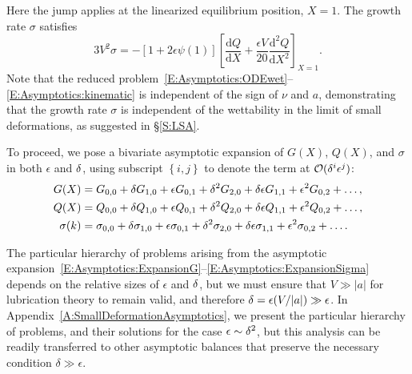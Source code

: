 \documentclass{jfm}
\newcommand{\dd}[2]{\frac{\mathrm{d} #1}{\mathrm{d} #2}}
\newcommand{\aspect}{a} %
\begin{document}
Here the jump applies at the linearized equilibrium position, $X = 1$. The growth rate $\sigma$ satisfies
\begin{equation}\label{E:Asymptotics:kinematic}
3V^2\sigma = -\left[1 + 2\epsilon \psi(1)\right]\left[\dd{Q}{X} + \frac{\epsilon V}{20}\dd{^2 Q}{X^2}\right]_{X = 1}.
\end{equation}
Note that the reduced problem~\eqref{E:Asymptotics:ODEwet}--\eqref{E:Asymptotics:kinematic} is independent of the sign of $\nu$ and $\aspect$, demonstrating that the growth rate $\sigma$ is independent of the wettability in the limit of small deformations, as suggested in \S\ref{S:LSA}.

To proceed, we pose a bivariate asymptotic expansion of $G(X)$, $Q(X)$, and $\sigma$ in both $\epsilon$ and $\delta$, using subscript $\left\{i,j\right\}$ to denote the term at $\mathcal{O}(\delta^i \epsilon^j)$:
\begin{align}
G(X) &=    G_{0,0} + \delta G_{1,0} + \epsilon G_{0,1} +  \delta^2 G_{2,0} + \delta \epsilon G_{1,1} + \epsilon^2 G_{0,2} + \dots,\label{E:Asymptotics:ExpansionG} \\
Q(X) &=  Q_{0,0} + \delta Q_{1,0} + \epsilon Q_{0,1} +  \delta^2 Q_{2,0} + \delta \epsilon Q_{1,1} + \epsilon^2 Q_{0,2}+\dots,\label{E:Asymptotics:ExpansionQ} \\
\sigma(k) &= \sigma_{0,0} + \delta \sigma_{1,0} + \epsilon \sigma_{0,1} +  \delta^2 \sigma_{2,0} + \delta \epsilon \sigma_{1,1} + \epsilon^2 \sigma_{0,2} + \dots. \label{E:Asymptotics:ExpansionSigma}
\end{align}

The particular hierarchy of problems arising from the asymptotic expansion~\eqref{E:Asymptotics:ExpansionG}--\eqref{E:Asymptotics:ExpansionSigma} depends on the relative sizes of $\epsilon$ and $\delta$, but we must ensure that $V \gg |a|$ for lubrication theory to remain valid, and therefore
$\delta  = \epsilon (V/|a|) \gg \epsilon$.  In Appendix~\ref{A:SmallDeformationAsymptotics}, we present the particular hierarchy of problems, and their solutions for the case $\epsilon \sim \delta^2$, but this analysis can be readily transferred to other asymptotic balances that preserve the necessary condition $\delta \gg \epsilon$.
\end{document}
